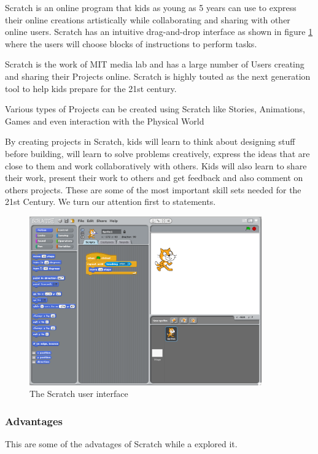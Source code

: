 Scratch \cite{sk} is an online program that kids as young as 5 years can use to express their online creations artistically while collaborating and sharing with other online users. Scratch has an intuitive drag-and-drop interface as shown in figure \ref{figI1} where the users will choose blocks of instructions to perform tasks.

Scratch is the work of MIT media lab and has a large number of Users creating and sharing their Projects online. Scratch is highly touted as the next generation tool to help kids prepare for the 21st century.

Various types of Projects can be created using Scratch like Stories, Animations, Games and even interaction with the Physical World

By creating projects in Scratch, kids will learn to think about designing stuff before building, will learn to solve problems creatively, express the ideas that are close to them and work collaboratively with others. Kids will also learn to share their work, present their work to others and get feedback and also comment on others projects. These are some of the most important skill sets needed for the 21st Century.
We turn our attention first to statements. 

\begin{figure}[!ht]
\renewcommand\thefigure{I.1} %
\centering
\includegraphics[width=10cm]{scratch.png}
\caption{The Scratch user interface }\label{figI1}
\end{figure}

\subsubsection{Advantages}

This are some of the advatages of Scratch while a explored it.

